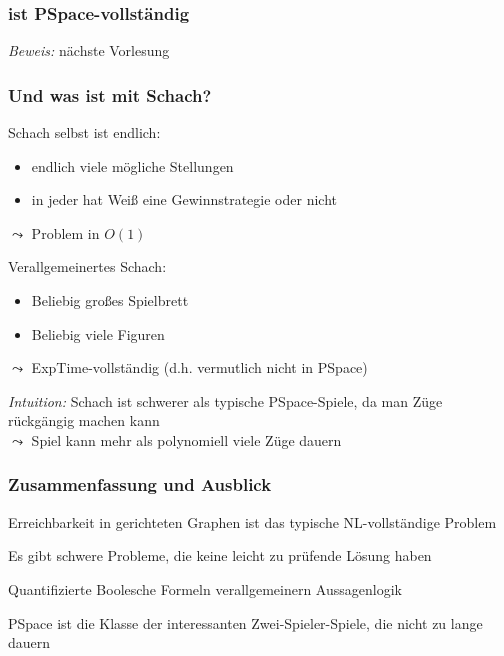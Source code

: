 \documentclass[aspectratio=1610,onlymath]{beamer}
\begin{document}
\begin{frame}\frametitle{ ist PSpace-vollständig}

\pause

\emph{Beweis:} nächste Vorlesung

\end{frame}

\begin{frame}\frametitle{Und was ist mit Schach?}
\pause

Schach selbst ist endlich:
\begin{itemize}
\item endlich viele mögliche Stellungen
\item in jeder hat Weiß eine Gewinnstrategie oder nicht
\end{itemize}
$\leadsto$ Problem in $O(1)$
\bigskip\pause

\alert{Verallgemeinertes Schach:}
\begin{itemize}
\item Beliebig großes Spielbrett
\item Beliebig viele Figuren
\end{itemize}
$\leadsto$ ExpTime-vollständig (d.h. vermutlich nicht in PSpace)
\bigskip\pause

\emph{Intuition:} Schach ist schwerer als typische PSpace-Spiele, da man 
Züge rückgängig machen kann\\
$\leadsto$ Spiel kann mehr als polynomiell viele Züge dauern
\end{frame}



\begin{frame}\frametitle{Zusammenfassung und Ausblick}

Erreichbarkeit in gerichteten Graphen ist das typische NL-vollständige Problem
\bigskip

Es gibt schwere Probleme, die keine leicht zu prüfende Lösung haben\bigskip

Quantifizierte Boolesche Formeln verallgemeinern Aussagenlogik\bigskip

PSpace ist die Klasse der interessanten Zwei-Spieler-Spiele, die nicht zu lange dauern
\bigskip


\end{frame}
\end{document}
